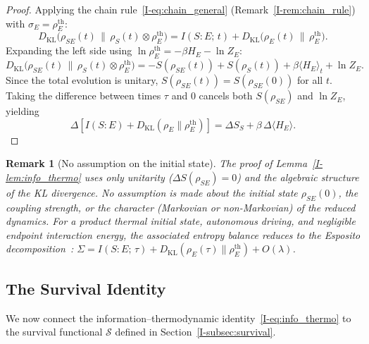\documentclass[12pt,a4paper,openany]{book}
\newtheorem{remark}[theorem]{Remark}
\begin{document}
\begin{proof}
Applying the chain rule~\eqref{I-eq:chain_general}
(Remark~\ref{I-rem:chain_rule}) with
$\sigma_E = \rho_E^{\mathrm{th}}$:
\begin{equation}
\label{I-eq:chain_step}
D_{\mathrm{KL}}\!\bigl(\rho_{SE}(t) \,\big\|\,
  \rho_S(t) \otimes \rho_E^{\mathrm{th}}\bigr)
= I(S{:}E;\, t)
  + D_{\mathrm{KL}}\!\bigl(\rho_E(t) \,\big\|\,
    \rho_E^{\mathrm{th}}\bigr).
\end{equation}
Expanding the left side using
$\ln\rho_E^{\mathrm{th}} = -\beta H_E - \ln Z_E$:
\begin{equation}
\label{I-eq:phi_expand}
D_{\mathrm{KL}}\!\bigl(\rho_{SE}(t) \,\big\|\,
  \rho_S(t) \otimes \rho_E^{\mathrm{th}}\bigr)
= -S(\rho_{SE}(t)) + S(\rho_S(t))
  + \beta\langle H_E \rangle_t + \ln Z_E.
\end{equation}
Since the total evolution is unitary,
$S(\rho_{SE}(t)) = S(\rho_{SE}(0))$ for all $t$.
Taking the difference between times $\tau$ and $0$ cancels
both $S(\rho_{SE})$ and $\ln Z_E$, yielding
\begin{equation}
\Delta\!\left[I(S{:}E)
  + D_{\mathrm{KL}}(\rho_E \| \rho_E^{\mathrm{th}})\right]
= \Delta S_S + \beta\,\Delta\langle H_E \rangle.
\end{equation}
\end{proof}

\begin{remark}[No assumption on the initial state]
\label{I-rem:no_product_lemma}
The proof of Lemma~\ref{I-lem:info_thermo} uses \emph{only}
unitarity ($\Delta S(\rho_{SE}) = 0$) and the algebraic
structure of the KL divergence.
No assumption is made about the initial state $\rho_{SE}(0)$,
the coupling strength, or the character (Markovian or
non-Markovian) of the reduced dynamics.
For a product thermal initial state, autonomous driving, and negligible
endpoint interaction energy, the associated entropy balance reduces to
the Esposito decomposition~\cite{EspositoLindenbergVandenBroeck2010}:
$\Sigma = I(S{:}E;\,\tau)
+ D_{\mathrm{KL}}(\rho_E(\tau) \| \rho_E^{\mathrm{th}})
+O(\lambda)$.
\end{remark}

\subsection{The Survival Identity}

We now connect the information--thermodynamic
identity~\eqref{I-eq:info_thermo} to the survival
functional $\mathcal{S}$ defined in
Section~\ref{I-subsec:survival}.
\end{document}
